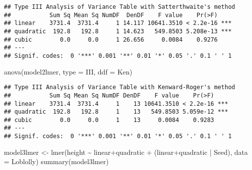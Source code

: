 \documentclass[
]{book}
\newenvironment{Shaded}{\begin{snugshade}}{\end{snugshade}}
\newcommand{\AttributeTok}[1]{\textcolor[rgb]{0.77,0.63,0.00}{#1}}
\newcommand{\FunctionTok}[1]{\textcolor[rgb]{0.00,0.00,0.00}{#1}}
\newcommand{\NormalTok}[1]{#1}
\newcommand{\OtherTok}[1]{\textcolor[rgb]{0.56,0.35,0.01}{#1}}
\newcommand{\SpecialCharTok}[1]{\textcolor[rgb]{0.00,0.00,0.00}{#1}}
\newcommand{\StringTok}[1]{\textcolor[rgb]{0.31,0.60,0.02}{#1}}
\begin{document}
\begin{verbatim}
## Type III Analysis of Variance Table with Satterthwaite's method
##           Sum Sq Mean Sq NumDF  DenDF    F value    Pr(>F)    
## linear    3731.4  3731.4     1 14.117 10641.3510 < 2.2e-16 ***
## quadratic  192.8   192.8     1 14.623   549.8503 5.208e-13 ***
## cubic        0.0     0.0     1 26.656     0.0084    0.9276    
## ---
## Signif. codes:  0 '***' 0.001 '**' 0.01 '*' 0.05 '.' 0.1 ' ' 1
\end{verbatim}

\begin{Shaded}
\begin{Highlighting}[]
\FunctionTok{anova}\NormalTok{(model2lmer, }\AttributeTok{type =} \StringTok{\textquotesingle{}III\textquotesingle{}}\NormalTok{, }\AttributeTok{ddf =} \StringTok{\textquotesingle{}Ken\textquotesingle{}}\NormalTok{)}
\end{Highlighting}
\end{Shaded}

\begin{verbatim}
## Type III Analysis of Variance Table with Kenward-Roger's method
##           Sum Sq Mean Sq NumDF DenDF    F value    Pr(>F)    
## linear    3731.4  3731.4     1    13 10641.3510 < 2.2e-16 ***
## quadratic  192.8   192.8     1    13   549.8503 5.059e-12 ***
## cubic        0.0     0.0     1    13     0.0084    0.9283    
## ---
## Signif. codes:  0 '***' 0.001 '**' 0.01 '*' 0.05 '.' 0.1 ' ' 1
\end{verbatim}

\begin{Shaded}
\begin{Highlighting}[]
\NormalTok{model3lmer }\OtherTok{\textless{}{-}} \FunctionTok{lmer}\NormalTok{(height }\SpecialCharTok{\textasciitilde{}}\NormalTok{ linear}\SpecialCharTok{+}\NormalTok{quadratic }\SpecialCharTok{+}\NormalTok{ (linear}\SpecialCharTok{+}\NormalTok{quadratic }\SpecialCharTok{|}\NormalTok{ Seed), }\AttributeTok{data =}\NormalTok{ Loblolly)}
\FunctionTok{summary}\NormalTok{(model3lmer)}
\end{Highlighting}
\end{Shaded}
\end{document}

